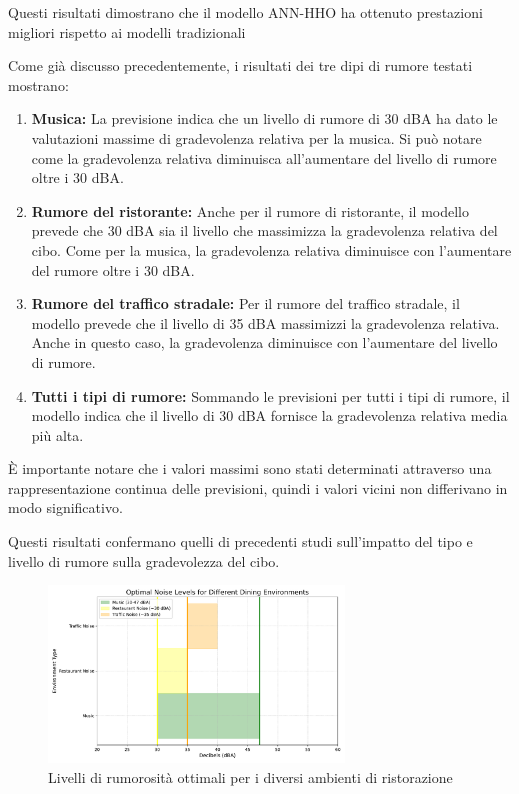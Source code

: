 Questi risultati dimostrano che il modello ANN-HHO ha ottenuto prestazioni migliori rispetto ai modelli tradizionali

Come già discusso precedentemente, i risultati dei tre dipi di rumore testati mostrano:

\begin{enumerate}
      \item \textbf{Musica: }La previsione indica che un livello di rumore di 30 dBA ha dato le valutazioni massime di gradevolenza relativa per la musica. Si può notare come la gradevolenza relativa diminuisca all'aumentare del livello di rumore oltre i 30 dBA.
      \item \textbf{Rumore del ristorante: }Anche per il rumore di ristorante, il modello prevede che 30 dBA sia il livello che massimizza la gradevolenza relativa del cibo. Come per la musica, la gradevolenza relativa diminuisce con l'aumentare del rumore oltre i 30 dBA.
      \item \textbf{Rumore del traffico stradale: }Per il rumore del traffico stradale, il modello prevede che il livello di 35 dBA massimizzi la gradevolenza relativa. Anche in questo caso, la gradevolenza diminuisce con l'aumentare del livello di rumore.
      \item \textbf{Tutti i tipi di rumore: }Sommando le previsioni per tutti i tipi di rumore, il modello indica che il livello di 30 dBA fornisce la gradevolenza relativa media più alta.
\end{enumerate}

È importante notare che i valori massimi sono stati determinati attraverso una rappresentazione continua delle previsioni, quindi i valori vicini non differivano in modo significativo.

Questi risultati confermano quelli di precedenti studi \cite{Alamirprecedentstudy} sull'impatto del tipo e livello di rumore sulla gradevolezza del cibo.

\begin{figure}[H]
      \centering
      \includegraphics[width=0.7\textwidth]{Chapters/Figures/optimal_noise_levels_improved.pdf} %
      \caption{\small Livelli di rumorosità ottimali per i diversi ambienti di ristorazione}
      \label{fig:graph_label}
\end{figure}


